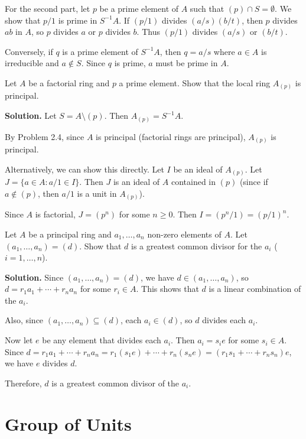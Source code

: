 For the second part, let $p$ be a prime element of $A$ such that $(p) \cap S = \emptyset$. We show that $p/1$ is prime in $S^{-1}A$. If $(p/1)$ divides $(a/s)(b/t)$, then $p$ divides $ab$ in $A$, so $p$ divides $a$ or $p$ divides $b$. Thus $(p/1)$ divides $(a/s)$ or $(b/t)$.

Conversely, if $q$ is a prime element of $S^{-1}A$, then $q = a/s$ where $a \in A$ is irreducible and $a \notin S$. Since $q$ is prime, $a$ must be prime in $A$.

\begin{problembox}
Let $A$ be a factorial ring and $p$ a prime element. Show that the local ring $A_{(p)}$ is principal.
\end{problembox}

\noindent\textbf{Solution.}
Let $S = A \setminus (p)$. Then $A_{(p)} = S^{-1}A$.

By Problem 2.4, since $A$ is principal (factorial rings are principal), $A_{(p)}$ is principal.

Alternatively, we can show this directly. Let $I$ be an ideal of $A_{(p)}$. Let $J = \{a \in A : a/1 \in I\}$. Then $J$ is an ideal of $A$ contained in $(p)$ (since if $a \notin (p)$, then $a/1$ is a unit in $A_{(p)}$).

Since $A$ is factorial, $J = (p^n)$ for some $n \geq 0$. Then $I = (p^n/1) = (p/1)^n$.

\begin{problembox}
Let $A$ be a principal ring and $a_1, \ldots, a_n$ non-zero elements of $A$. Let $(a_1, \ldots, a_n) = (d)$. Show that $d$ is a greatest common divisor for the $a_i$ ($i = 1, \ldots, n$).
\end{problembox}

\noindent\textbf{Solution.}
Since $(a_1, \ldots, a_n) = (d)$, we have $d \in (a_1, \ldots, a_n)$, so $d = r_1a_1 + \cdots + r_na_n$ for some $r_i \in A$. This shows that $d$ is a linear combination of the $a_i$.

Also, since $(a_1, \ldots, a_n) \subseteq (d)$, each $a_i \in (d)$, so $d$ divides each $a_i$.

Now let $e$ be any element that divides each $a_i$. Then $a_i = s_i e$ for some $s_i \in A$. Since $d = r_1a_1 + \cdots + r_na_n = r_1(s_1e) + \cdots + r_n(s_ne) = (r_1s_1 + \cdots + r_ns_n)e$, we have $e$ divides $d$.

Therefore, $d$ is a greatest common divisor of the $a_i$.

\section{Group of Units}

